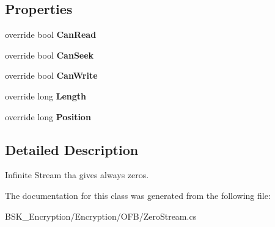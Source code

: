 \subsection*{Properties}
\begin{DoxyCompactItemize}
\item 
\mbox{\label{class_b_s_k___encryption_1_1_encryption_1_1_o_f_b_1_1_zero_stream_af2f1571c15481ab5ae68ef15e146f2a0}} 
override bool {\bfseries Can\+Read}
\item 
\mbox{\label{class_b_s_k___encryption_1_1_encryption_1_1_o_f_b_1_1_zero_stream_a5692e8759711504610ab938c72550860}} 
override bool {\bfseries Can\+Seek}
\item 
\mbox{\label{class_b_s_k___encryption_1_1_encryption_1_1_o_f_b_1_1_zero_stream_ad8eb981bca8f777a03027a482500eaef}} 
override bool {\bfseries Can\+Write}
\item 
\mbox{\label{class_b_s_k___encryption_1_1_encryption_1_1_o_f_b_1_1_zero_stream_a5923a6c8a9767862fc83546950bc467e}} 
override long {\bfseries Length}
\item 
\mbox{\label{class_b_s_k___encryption_1_1_encryption_1_1_o_f_b_1_1_zero_stream_a4a54dd7cb54404fd11ab65986e8b3dd9}} 
override long {\bfseries Position}
\end{DoxyCompactItemize}


\subsection{Detailed Description}
Infinite Stream tha gives always zeros. 



The documentation for this class was generated from the following file\+:\begin{DoxyCompactItemize}
\item 
B\+S\+K\+\_\+\+Encryption/\+Encryption/\+O\+F\+B/Zero\+Stream.\+cs\end{DoxyCompactItemize}
